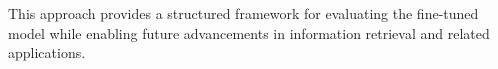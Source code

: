 \begin{enumerate}

\end{enumerate}

This approach provides a structured framework for evaluating the fine-tuned model while enabling future advancements in information retrieval and related applications.


